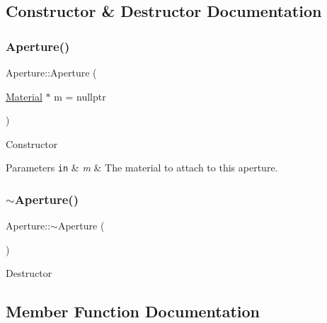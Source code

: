 \subsection{Constructor \& Destructor Documentation}
\mbox{\label{classAperture_ad20a215bea35fe695d98c1d4e000112f}} 
\subsubsection{\texorpdfstring{Aperture()}{Aperture()}}
{\footnotesize\ttfamily Aperture\+::\+Aperture (\begin{DoxyParamCaption}\item[{\hyperlink{classMaterial}{Material} $\ast$}]{m = {\ttfamily nullptr} }\end{DoxyParamCaption})\hspace{0.3cm}{\ttfamily [inline]}}

Constructor 
\begin{DoxyParams}[1]{Parameters}
\mbox{\tt in}  & {\em m} & The material to attach to this aperture. \\
\hline
\end{DoxyParams}
\mbox{\label{classAperture_ad2ec00bf784a25710ce4049f339513d6}} 
\subsubsection{\texorpdfstring{$\sim$\+Aperture()}{~Aperture()}}
{\footnotesize\ttfamily Aperture\+::$\sim$\+Aperture (\begin{DoxyParamCaption}{ }\end{DoxyParamCaption})\hspace{0.3cm}{\ttfamily [virtual]}}

Destructor 

\subsection{Member Function Documentation}
\mbox{\label{classAperture_ad7af612271a0586feea83c38549dfb75}} 
